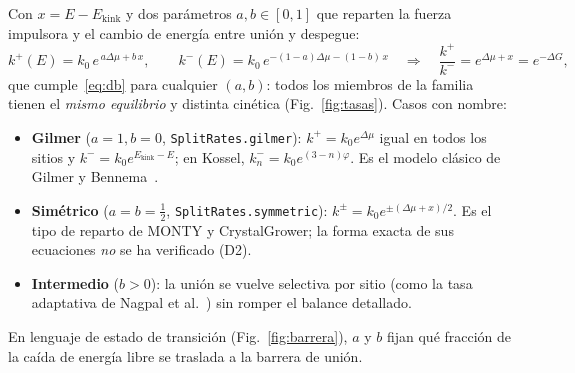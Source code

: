 \documentclass[11pt,a4paper]{article}
\newcommand{\code}[1]{\texttt{#1}}
\newcommand{\Ekink}{E_{\mathrm{kink}}}
\newcommand{\dmu}{\Delta\mu}
\begin{document}
Con $x=E-\Ekink$ y dos parámetros $a,b\in[0,1]$ que reparten la fuerza impulsora y el cambio de
energía entre unión y despegue:
\begin{equation}
k^+(E)=k_0\,e^{\,a\dmu+b\,x},\qquad k^-(E)=k_0\,e^{-(1-a)\dmu-(1-b)\,x}
\quad\Longrightarrow\quad \frac{k^+}{k^-}=e^{\dmu+x}=e^{-\Delta G},
\label{eq:split}
\end{equation}
que cumple~\eqref{eq:db} para cualquier $(a,b)$: todos los miembros de la familia tienen el
\emph{mismo equilibrio} y distinta cinética (Fig.~\ref{fig:tasas}). Casos con nombre:
\begin{itemize}
\item \textbf{Gilmer} ($a=1,b=0$, \code{SplitRates.gilmer}): $k^+=k_0e^{\dmu}$ igual en todos los
sitios y $k^-=k_0e^{\Ekink-E}$; en Kossel, $k^-_n=k_0e^{(3-n)\varphi}$. Es el modelo clásico de
Gilmer y Bennema~\cite{gilmer1972}.
\item \textbf{Simétrico} ($a=b=\tfrac12$, \code{SplitRates.symmetric}): $k^\pm=k_0e^{\pm(\dmu+x)/2}$.
Es el tipo de reparto de MONTY y CrystalGrower; la forma exacta de sus ecuaciones \emph{no} se ha
verificado (D2).
\item \textbf{Intermedio} ($b>0$): la unión se vuelve selectiva por sitio (como la tasa adaptativa de
Nagpal et al.~\cite{nagpal2024}) sin romper el balance detallado.
\end{itemize}
En lenguaje de estado de transición (Fig.~\ref{fig:barrera}), $a$ y $b$ fijan qué fracción de la
caída de energía libre se traslada a la barrera de unión.
\end{document}

